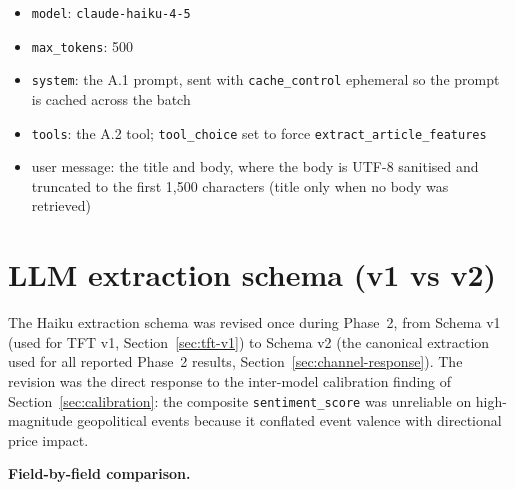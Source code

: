 \begin{itemize}
  \item \texttt{model}: \texttt{claude-haiku-4-5}
  \item \texttt{max\_tokens}: 500
  \item \texttt{system}: the A.1 prompt, sent with \texttt{cache\_control} ephemeral so the prompt is cached across the batch
  \item \texttt{tools}: the A.2 tool; \texttt{tool\_choice} set to force \texttt{extract\_article\_features}
  \item user message: the title and body, where the body is UTF-8 sanitised and truncated to the first 1{,}500 characters (title only when no body was retrieved)
\end{itemize}

\chapter{LLM extraction schema (v1 vs v2)}\label{app:schema}

The Haiku extraction schema was revised once during Phase~2, from Schema v1 (used for TFT v1, Section~\ref{sec:tft-v1}) to Schema v2 (the canonical extraction used for all reported Phase~2 results, Section~\ref{sec:channel-response}). The revision was the direct response to the inter-model calibration finding of Section~\ref{sec:calibration}: the composite \texttt{sentiment\_score} was unreliable on high-magnitude geopolitical events because it conflated event valence with directional price impact.

\textbf{Field-by-field comparison.}

